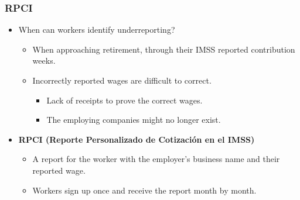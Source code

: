 \documentclass[notes,11pt, aspectratio=169]{beamer}
\begin{document}
\begin{frame}
\frametitle{RPCI}
\begin{itemize}[<+->]
    \vfill\item<1-> When can workers identify underreporting?
    \begin{itemize}
        \vfill\item<2-> When approaching retirement, through their IMSS reported contribution weeks.
        \vfill\item<2-> Incorrectly reported wages are difficult to correct.
        \begin{itemize}
            \vfill\item<3-> Lack of receipts to prove the correct wages.
            \vfill\item<3-> The employing companies might no longer exist.
        \end{itemize}
    \end{itemize}
    \vfill\item<4-> \textbf{RPCI (Reporte Personalizado de Cotización en el IMSS)}
    \begin{itemize}
        \vfill\item<5-> A report for the worker with the employer's business name and their reported wage.
        \vfill\item<6-> Workers sign up once and receive the report month by month.
    \end{itemize}
\end{itemize}
\end{frame}
\end{document}
